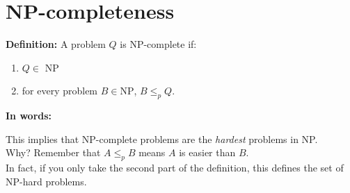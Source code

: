 \documentclass[11  pt]{article}
\begin{document}
\newpage


\section{NP-completeness}

\textbf{Definition: } A problem $Q$ is NP-complete if:
\begin{enumerate}
	\item $Q \in$ NP
	\item for every problem $B \in \text{NP}$, $B \leq_p Q$. \\
\end{enumerate}

\textbf{In words:} \\ %


\vs{8cm}

This implies that NP-complete problems are the \emph{hardest} problems in NP. \\


Why? Remember that $A \leq_p B$ means $A$ is easier than $B$. \\

In fact, if you only take the second part of the definition, this defines the set of NP-hard problems.



%
%
%
%
%
%
%
%


	

	
	
\end{document}
